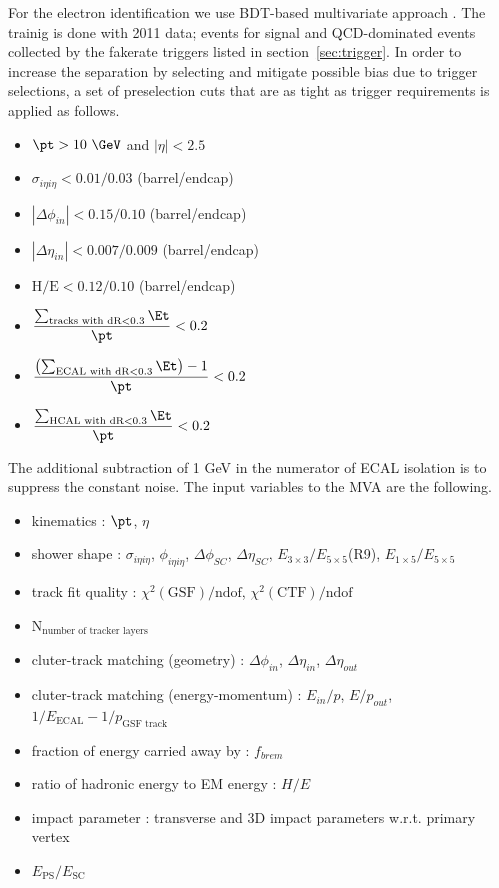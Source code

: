 For the electron identification we use BDT-based multivariate approach \cite{electronBDT}.  
The trainig is done with 2011 data; \dyll{} events for signal and QCD-dominated events 
collected by the fakerate triggers listed in section~\ref{sec:trigger}. 
In order to increase the separation by selecting and mitigate possible bias 
due to trigger selections, a set of preselection cuts that are as tight as trigger 
requirements is applied as follows. 
\begin{itemize}
  \item $\pt>10~\GeV$ and $|\eta| < 2.5$
  \item $\sigma_{i\eta i\eta} < 0.01/0.03$ (barrel/endcap)
  \item $|\Delta\phi_{in}| < 0.15/0.10$ (barrel/endcap)
  \item $|\Delta\eta_{in}| < 0.007/0.009$ (barrel/endcap)
  \item $\textrm{H/E}< 0.12/0.10$ (barrel/endcap)
  \item $\displaystyle \frac{\sum_{\textrm{tracks with dR}<0.3}\Et}{\pt}<0.2$
  \item $\displaystyle \frac{\left(\sum_{\textrm{ECAL with dR}<0.3}\Et\right)-1}{\pt}<0.2$
  \item $\displaystyle \frac{\sum_{\textrm{HCAL with dR}<0.3}\Et}{\pt}<0.2$
\end{itemize}
The additional subtraction of 1 GeV in the numerator of ECAL isolation is 
to suppress the constant noise. 
The input variables to the MVA are the following.
\begin{itemize}
\item kinematics : $\pt$,  $\eta$
\item shower shape : $\sigma_{i\eta i\eta}$, $\phi_{i\eta i\eta}$, $\Delta \phi_{SC}$, $\Delta \eta_{SC}$, $E_{3\times3}/E_{5\times5}$(R9), $E_{1\times5}/E_{5\times5}$
\item track fit quality : $\chi^2(\textrm{GSF})/\textrm{ndof} $, $\chi^2(\textrm{CTF})/\textrm{ndof}$ 
\item $\textrm{N}_\textrm{number of tracker layers}$  
\item cluter-track matching (geometry) : $\Delta \phi_{in}$, $\Delta \eta_{in}$, $\Delta \eta_{out}$
\item cluter-track matching (energy-momentum) : $E_{in}/p$, $E/p_{out}$, $1/E_\textrm{ECAL} - 1/p_{\textrm{GSF track}}$ 
\item fraction of energy carried away by \brem{} : $f_{brem}$ 
\item ratio of hadronic energy to EM energy  : $H/E$ 
\item impact parameter :  transverse and 3D impact parameters w.r.t. primary vertex
\item $E_{\textrm{PS}}/E_{\textrm{SC}}$
\end{itemize}
